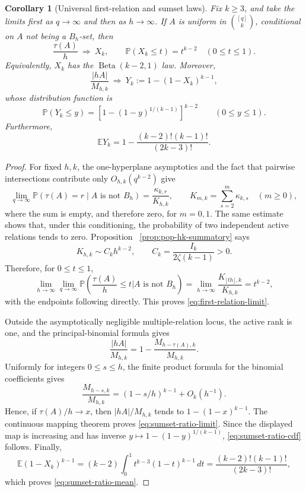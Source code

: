 \documentclass[11pt,reqno]{amsart}
\newtheorem{corollary}[theorem]{Corollary}
\theoremstyle{definition}
\theoremstyle{remark}
\begin{document}
\begin{corollary}[Universal first-relation and sumset laws]
\label{cor:conditional-limit}
Fix $k\geq3$, and take the limits first as $q\to\infty$ and then as
$h\to\infty$.  If $A$ is uniform in $\binom{[q]}k$, conditional on $A$
not being a $B_h$-set, then
\begin{equation}\label{eq:first-relation-limit}
 \frac{\tau(A)}h\ \Longrightarrow\ X_k,
 \qquad \mathbb P(X_k\leq t)=t^{k-2}\quad(0\leq t\leq1).
\end{equation}
Equivalently, $X_k$ has the $\operatorname{Beta}(k-2,1)$ law.  Moreover,
\begin{equation}\label{eq:sumset-ratio-limit}
 \frac{|hA|}{M_{h,k}}\ \Longrightarrow\
 Y_k:=1-(1-X_k)^{k-1},
\end{equation}
whose distribution function is
\begin{equation}\label{eq:sumset-ratio-cdf}
 \mathbb P(Y_k\leq y)=
 \left[1-(1-y)^{1/(k-1)}\right]^{k-2}
 \qquad(0\leq y\leq1).
\end{equation}
Furthermore,
\begin{equation}\label{eq:sumset-ratio-mean}
 \mathbb E Y_k
 =1-\frac{(k-2)!(k-1)!}{(2k-3)!}.
\end{equation}
\end{corollary}

\begin{proof}
For fixed $h,k$, the one-hyperplane asymptotics and the fact that pairwise
intersections contribute only $O_{h,k}(q^{k-2})$ give
\[
 \lim_{q\to\infty}
 \mathbb P(\tau(A)=r\mid A\text{ is not }B_h)
 =\frac{\kappa_{k,r}}{K_{h,k}},
 \qquad K_{m,k}=\sum_{s=2}^m\kappa_{k,s}\quad(m\geq0),
\]
where the sum is empty, and therefore zero, for $m=0,1$.
The same estimate shows that, under this conditioning, the probability of
two independent active relations tends to zero.  Proposition~
\ref{prop:pop-hk-summatory} says
\[
 K_{h,k}\sim C_kh^{k-2},\qquad C_k=\frac{I_k}{2\zeta(k-1)}>0.
\]
Therefore, for $0\leq t\leq1$,
\[
 \lim_{h\to\infty}\lim_{q\to\infty}
 \mathbb P\left(\frac{\tau(A)}h\leq t
                  \mathrel{\Big|} A\text{ is not }B_h\right)
 =\lim_{h\to\infty}\frac{K_{\lfloor th\rfloor,k}}{K_{h,k}}
 =t^{k-2},
\]
with the endpoints following directly.  This proves
\eqref{eq:first-relation-limit}.

Outside the asymptotically negligible multiple-relation locus, the active
rank is one, and the principal-binomial formula gives
\[
 \frac{|hA|}{M_{h,k}}
 =1-\frac{M_{h-\tau(A),k}}{M_{h,k}}.
\]
Uniformly for integers $0\leq s\leq h$, the finite product formula for the binomial
coefficients gives
\[
 \frac{M_{h-s,k}}{M_{h,k}}
 =(1-s/h)^{k-1}+O_k(h^{-1}).
\]
Hence, if $\tau(A)/h\to x$, then $|hA|/M_{h,k}$ tends to
$1-(1-x)^{k-1}$.  The continuous mapping theorem proves
\eqref{eq:sumset-ratio-limit}.  Since the displayed map is increasing and has
inverse $y\mapsto1-(1-y)^{1/(k-1)}$,
\eqref{eq:sumset-ratio-cdf} follows.
Finally,
\[
 \mathbb E(1-X_k)^{k-1}
 =(k-2)\int_0^1t^{k-3}(1-t)^{k-1}\,dt
 =\frac{(k-2)!(k-1)!}{(2k-3)!},
\]
which proves \eqref{eq:sumset-ratio-mean}.
\end{proof}
\end{document}
